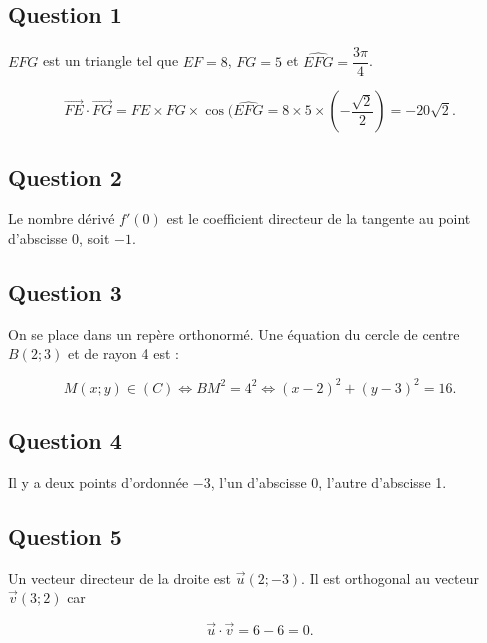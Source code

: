 \subsection*{Question 1}
	
	\(EFG\) est un triangle tel que \(EF = 8\), \(FG = 5\) et \(\widehat{EFG} = \dfrac{3\pi}{4}\).
	
	\[
	\overrightarrow{FE} \cdot \overrightarrow{FG} = FE \times FG \times \cos(\widehat{EFG} = 8 \times 5 \times \left( -\dfrac{\sqrt{2}}{2} \right) = -20 \sqrt{2}.
	\]
	
	\subsection*{Question 2}
	
	Le nombre dérivé \(f'(0)\) est le coefficient directeur de la tangente au point d’abscisse 0, soit \(-1\).
	
	\subsection*{Question 3}
	
	On se place dans un repère orthonormé. Une équation du cercle de centre \(B(2 ; 3)\) et de rayon 4 est :
	
	\[
	M(x ; y) \in (C) \iff BM^2 = 4^2 \iff (x - 2)^2 + (y - 3)^2 = 16.
	\]
	
	\subsection*{Question 4}
	
	Il y a deux points d’ordonnée \(-3\), l’un d’abscisse 0, l’autre d’abscisse 1.
	
	\subsection*{Question 5}
	
	Un vecteur directeur de la droite est \(\overrightarrow{u}(2 ; -3)\). Il est orthogonal au vecteur \(\overrightarrow{v}(3 ; 2)\) car
	
	\[
	\overrightarrow{u} \cdot \overrightarrow{v} = 6 - 6 = 0.
	\]
